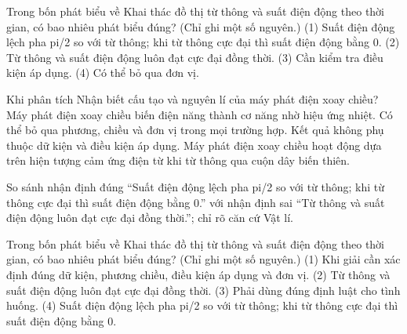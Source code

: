 \begin{ex}
Trong bốn phát biểu về Khai thác đồ thị từ thông và suất điện động theo thời gian, có bao nhiêu phát biểu đúng? (Chỉ ghi một số nguyên.) (1) Suất điện động lệch pha pi/2 so với từ thông; khi từ thông cực đại thì suất điện động bằng 0. (2) Từ thông và suất điện động luôn đạt cực đại đồng thời. (3) Cần kiểm tra điều kiện áp dụng. (4) Có thể bỏ qua đơn vị.
\end{ex}

\begin{ex}
Khi phân tích Nhận biết cấu tạo và nguyên lí của máy phát điện xoay chiều?
\choice
{Máy phát điện xoay chiều biến điện năng thành cơ năng nhờ hiệu ứng nhiệt.}
{Có thể bỏ qua phương, chiều và đơn vị trong mọi trường hợp.}
{Kết quả không phụ thuộc dữ kiện và điều kiện áp dụng.}
{\True Máy phát điện xoay chiều hoạt động dựa trên hiện tượng cảm ứng điện từ khi từ thông qua cuộn dây biến thiên.}
\end{ex}

\begin{bt}
So sánh nhận định đúng “Suất điện động lệch pha pi/2 so với từ thông; khi từ thông cực đại thì suất điện động bằng 0.” với nhận định sai “Từ thông và suất điện động luôn đạt cực đại đồng thời.”; chỉ rõ căn cứ Vật lí.
\end{bt}

\begin{ex}
Trong bốn phát biểu về Khai thác đồ thị từ thông và suất điện động theo thời gian, có bao nhiêu phát biểu đúng? (Chỉ ghi một số nguyên.) (1) Khi giải cần xác định đúng dữ kiện, phương chiều, điều kiện áp dụng và đơn vị. (2) Từ thông và suất điện động luôn đạt cực đại đồng thời. (3) Phải dùng đúng định luật cho tình huống. (4) Suất điện động lệch pha pi/2 so với từ thông; khi từ thông cực đại thì suất điện động bằng 0.
\end{ex}

